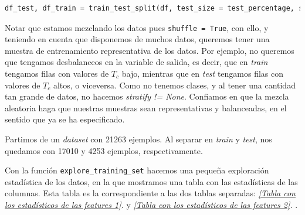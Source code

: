 \documentclass[11pt]{article}
\begin{document}
\begin{lstlisting}[language=Python]
    df_test, df_train = train_test_split(df, test_size = test_percentage, shuffle = True, stratify = None)
\end{lstlisting}

Notar que estamos mezclando los datos pues \lstinline{shuffle = True}, con ello, y teniendo en cuenta que disponemos de muchos datos, queremos tener una muestra de entrenamiento representativa de los datos. Por ejemplo, no queremos que tengamos desbalanceos en la variable de salida, es decir, que en \emph{train} tengamos filas con valores de $T_c$ bajo, mientras que en \emph{test} tengamos filas con valores de $T_c$ altos, o viceversa. Como no tenemos clases, y al tener una cantidad tan grande de datos, no hacemos \emph{stratify != None}. Confiamos en que la mezcla aleatoria haga que nuestras muestras sean representativas y balanceadas, en el sentido que ya se ha especificado.

Partimos de un \emph{dataset} con 21263 ejemplos. Al separar en \emph{train} y \emph{test}, nos quedamos con 17010 y 4253 ejemplos, respectivamente.

Con la función \lstinline{explore_training_set} hacemos una pequeña exploración estadística de los datos, en la que mostramos una tabla con las estadísticas de las columnas. Esta tabla es la correspondiente a las dos tablas separadas: \emph{\ref{Tabla con los estadísticos de las features 1}. } y \emph{\ref{Tabla con los estadísticos de las features 2}. }.
\end{document}
